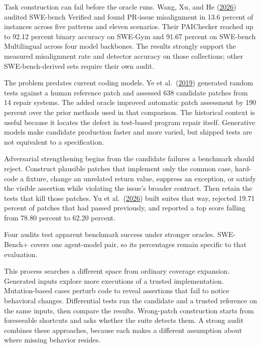 Task construction can fail before the oracle runs. Wang, Xu, and He (\href{https://arxiv.org/abs/2607.28587}{2026}) audited SWE-bench Verified and found PR-issue misalignment in 13.6 percent of instances across five patterns and eleven scenarios. Their PAIChecker reached up to 92.12 percent binary accuracy on SWE-Gym and 91.67 percent on SWE-bench Multilingual across four model backbones. The results strongly support the measured misalignment rate and detector accuracy on those collections; other SWE-bench-derived sets require their own audit.

The problem predates current coding models. Ye et al.~(\href{https://arxiv.org/abs/1909.13694}{2019}) generated random tests against a human reference patch and assessed 638 candidate patches from 14 repair systems. The added oracle improved automatic patch assessment by 190 percent over the prior methods used in that comparison. The historical context is useful because it locates the defect in test-based program repair itself. Generative models make candidate production faster and more varied, but shipped tests are not equivalent to a specification.

Adversarial strengthening begins from the candidate failures a benchmark should reject. Construct plausible patches that implement only the common case, hard-code a fixture, change an unrelated return value, suppress an exception, or satisfy the visible assertion while violating the issue's broader contract. Then retain the tests that kill those patches. Yu et al.~(\href{https://arxiv.org/abs/2603.00520}{2026}) built suites that way, rejected 19.71 percent of patches that had passed previously, and reported a top score falling from 78.80 percent to 62.20 percent.

Four audits test apparent benchmark success under stronger oracles. SWE-Bench+ covers one agent-model pair, so its percentages remain specific to that evaluation.

This process searches a different space from ordinary coverage expansion. Generated inputs explore more executions of a trusted implementation. Mutation-based cases perturb code to reveal assertions that fail to notice behavioral changes. Differential tests run the candidate and a trusted reference on the same inputs, then compare the results. Wrong-patch construction starts from foreseeable shortcuts and asks whether the suite detects them. A strong audit combines these approaches, because each makes a different assumption about where missing behavior resides.


